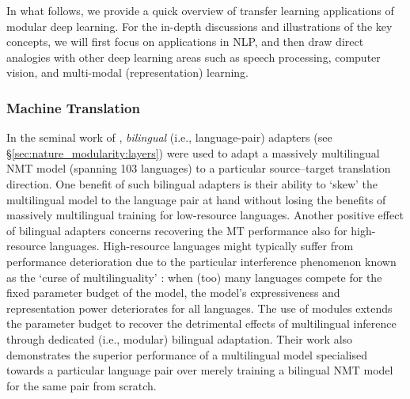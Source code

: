
In what follows, we provide a quick overview of transfer learning applications of modular deep learning. For the in-depth discussions and illustrations of the key concepts, we will first focus on applications in NLP, and then draw direct analogies with other deep learning areas such as speech processing, computer vision, and multi-modal (representation) learning.

\subsubsection{Machine Translation}
\label{ss:nmt}

In the seminal work of \citet{Bapna2019Adapters}, \textit{bilingual} (i.e., language-pair) adapters (see \S\ref{sec:nature_modularity:layers}) were used to adapt a massively multilingual NMT model (spanning 103 languages) to a particular source--target translation direction. One benefit of such bilingual adapters is their ability to `skew' the multilingual model to the language pair at hand without losing the benefits of massively multilingual training for low-resource languages. Another positive effect of bilingual adapters concerns recovering the MT performance also for high-resource languages. High-resource languages might typically suffer from performance deterioration due to the particular interference phenomenon known as the `curse of multilinguality' \citep{conneau-etal-2020-unsupervised,wang-etal-2020-negative}: when (too) many languages compete for the fixed parameter budget of the model, the model's expressiveness and representation power deteriorates for all languages. The use of modules extends the parameter budget to recover the detrimental effects of multilingual inference through dedicated (i.e., modular) bilingual adaptation. %
Their work also demonstrates the superior performance of a multilingual model specialised towards a particular language pair over merely training a bilingual NMT model for the same pair from scratch.


